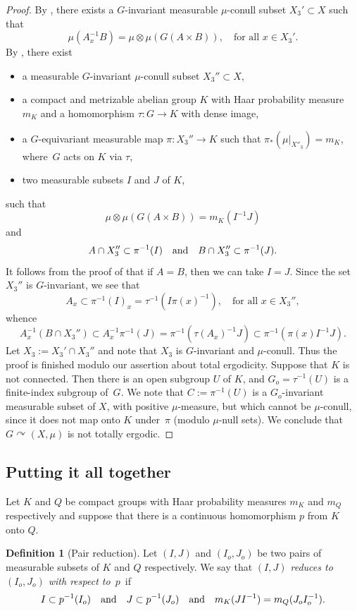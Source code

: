 \documentclass[10pt]{amsart}
\newcommand{\qand}{\quad\textup{and}\quad}
\let\acts\curvearrowright
\theoremstyle{plain}
\theoremstyle{definition}
\newtheorem{definition}[theorem]{Definition}
\begin{document}
\begin{proof}
By \cite[Lem.\,5.3]{BF}, there exists a $G$-invariant measurable $\mu$-conull subset \hbox{$X_3' \subset X$} such that
\[
\mu(A_x^{-1}B) = \mu \otimes \mu(G(A \times B)), \quad \textrm{for all $x \in X_3'$}.
\]
By \cite[Th.\,5.1]{BF}, there exist
\begin{itemize}
\item a measurable $G$-invariant $\mu$-conull subset $X_3'' \subset X$,
\item a compact and metrizable abelian group $K$ with Haar probability measure $m_K$ and
a homomorphism $\tau : G \to K$ with dense image,
\item a $G$-equivariant measurable map $\pi : X_3''\!\to\!K$ such that $\pi_*(\mu |_{X''_3})\!=\!m_K$, where~$G$ acts on $K$ via $\tau$,
\item two measurable subsets $I$ and $J$ of $K$,
\end{itemize}
such that
\[
\mu \otimes \mu (G(A \times B)) = m_K(I^{-1}J)
\]
and
\[
A \cap X_3'' \subset \pi^{-1}(I) \qand B \cap X_3'' \subset \pi^{-1}(J).
\]
It follows from the proof of \cite[Th.\,5.1]{BF} that if $A = B$, then we can take $I = J$. Since the set $X_3''$ is $G$-invariant,
we see that
\[
A_x \subset \pi^{-1}(I)_x = \tau^{-1}(I\pi(x)^{-1}), \quad \textrm{for all $x \in X_3''$},
\]
whence
\[
A_x^{-1}(B \cap X_3'') \subset A_x^{-1}\pi^{-1}(J) = \pi^{-1}(\tau(A_x)^{-1}J) \subset \pi^{-1}(\pi(x) I^{-1}J).
\]
Let $X_3 := X_3' \cap X_3''$ and note that $X_3$ is $G$-invariant and $\mu$-conull. Thus the proof is finished modulo our assertion about total ergodicity. Suppose that $K$ is not connected. Then there is an open subgroup $U$ of $K$, and $G_o = \tau^{-1}(U)$ is a finite-index
subgroup of~$G$. We note that $C := \pi^{-1}(U)$ is a $G_o$-invariant measurable subset of $X$, with positive $\mu$-measure, but
which cannot be $\mu$-conull, since it does not map onto $K$ under~$\pi$ (modulo $\mu$-null sets). We conclude that $G \acts (X,\mu)$
is not totally ergodic.
\end{proof}

\subsection{Putting it all together}

Let $K$ and $Q$ be compact groups with Haar probability measures $m_K$ and $m_Q$ respectively and
suppose that there is a continuous homomorphism $p$ from $K$ onto $Q$.

\begin{definition}[Pair reduction]
\label{def_reduction}
Let $(I,J)$ and $(I_o,J_o)$ be two pairs of measurable subsets of $K$ and $Q$ respectively. We say
that \emph{$(I,J)$ reduces to $(I_o,J_o)$ with respect to~$p$}~if
\[
I \subset p^{-1}(I_o) \qand J \subset p^{-1}(J_o) \qand m_K(J I^{-1}) = m_Q(J_o I_o^{-1}).
\]
\end{definition}
\end{document}
